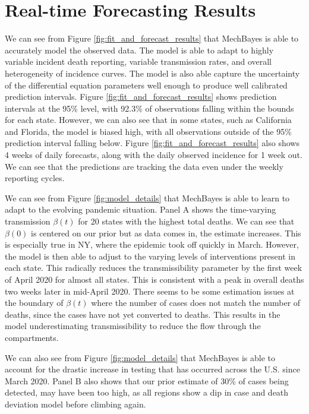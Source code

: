 \documentclass{umassthesis}          %
\begin{document}
\section{Real-time Forecasting Results}

We can see from Figure \ref{fig:fit_and_forecast_results} that MechBayes is able to accurately model the observed data. The model is able to adapt to highly variable incident death reporting, variable transmission rates, and overall heterogeneity of incidence curves. The model is also able capture the uncertainty of the differential equation parameters well enough to produce well calibrated prediction intervals. Figure \ref{fig:fit_and_forecast_results}  shows prediction intervals at the 95\% level, with 92.3\% of observations falling within the bounds for each state. However, we can also see that in some states, such as California and Florida, the model is biased high, with all observations outside of the 95\% prediction interval falling below. Figure \ref{fig:fit_and_forecast_results}  also shows 4 weeks of daily forecasts, along with the daily observed incidence for 1 week out. We can see that the predictions are tracking the data even under the weekly reporting cycles. 

We can see from Figure \ref{fig:model_details} that MechBayes is able to learn to adapt to the evolving pandemic situation. Panel A shows the time-varying transmission $\beta(t)$ for 20 states with the highest total deaths. We can see that $\beta(0)$ is centered on our prior but as data comes in, the estimate increases. This is especially true in NY, where the epidemic took off quickly in March. However, the model is then able to adjust to the varying levels of interventions present in each state. This radically reduces the transmissibility parameter by the first week of April 2020 for almost all states. This is consistent with a peak in overall deaths two weeks later in mid-April 2020. There seems to be some estimation issues at the boundary of $\beta(t)$ where the number of cases does not match the number of deaths, since the cases have not yet converted to deaths. This results in the model underestimating transmissibility to reduce the flow through the compartments. 

We can also see from Figure \ref{fig:model_details}  that MechBayes is able to account for the drastic increase in testing that has occurred across the U.S. since March 2020. Panel B also shows that our prior estimate of 30\% of cases being detected, may have been too high, as all regions show a dip in case and death deviation model before climbing again. 
\end{document}
